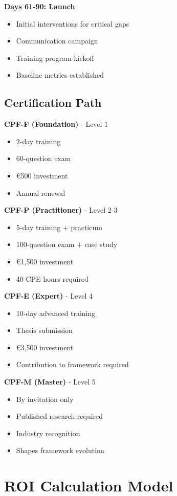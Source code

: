 \documentclass[11pt,a4paper]{article}
\begin{document}
\textbf{Days 61-90: Launch}
\begin{itemize}
\item Initial interventions for critical gaps
\item Communication campaign
\item Training program kickoff
\item Baseline metrics established
\end{itemize}

\subsection{Certification Path}

\textbf{CPF-F (Foundation)} - Level 1
\begin{itemize}
\item 2-day training
\item 60-question exam
\item €500 investment
\item Annual renewal
\end{itemize}

\textbf{CPF-P (Practitioner)} - Level 2-3
\begin{itemize}
\item 5-day training + practicum
\item 100-question exam + case study
\item €1,500 investment
\item 40 CPE hours required
\end{itemize}

\textbf{CPF-E (Expert)} - Level 4
\begin{itemize}
\item 10-day advanced training
\item Thesis submission
\item €3,500 investment
\item Contribution to framework required
\end{itemize}

\textbf{CPF-M (Master)} - Level 5
\begin{itemize}
\item By invitation only
\item Published research required
\item Industry recognition
\item Shapes framework evolution
\end{itemize}

\section{ROI Calculation Model}
\end{document}

